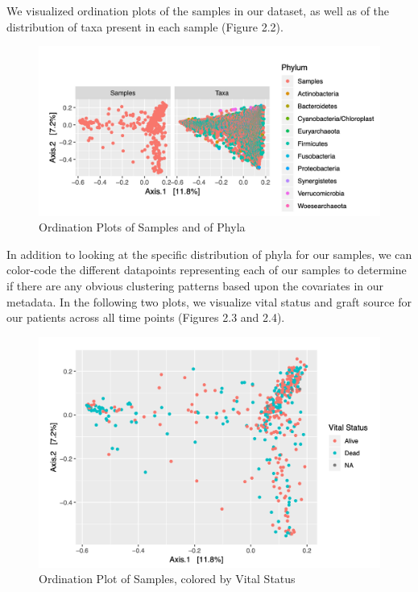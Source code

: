 \documentclass[12pt,twoside]{dukestatscithesis}
\begin{document}
We visualized ordination plots of the samples in our dataset, as well as
of the distribution of taxa present in each sample (Figure 2.2).
\begin{figure}
\includegraphics[width=700px]{figure/figure4} \caption{Ordination Plots of Samples and of Phyla}\label{fig:figure4}
\end{figure}
In addition to looking at the specific distribution of phyla for our
samples, we can color-code the different datapoints representing each of
our samples to determine if there are any obvious clustering patterns
based upon the covariates in our metadata. In the following two plots,
we visualize vital status and graft source for our patients across all
time points (Figures 2.3 and 2.4).
\begin{figure}
\includegraphics[width=700px]{figure/figure5} \caption{Ordination Plot of Samples, colored by Vital Status}\label{fig:figure5}
\end{figure}
\end{document}
